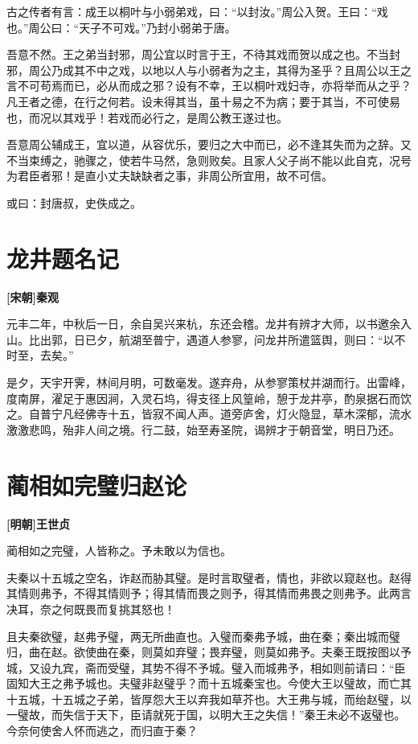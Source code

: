 \documentclass[UTF8,titlepage,oneside]{ctexbook}
\begin{document}
古之传者有言：成王以桐叶与小弱弟戏，曰：“以封汝。”周公入贺。王曰：“戏也。”周公曰：“天子不可戏。”乃封小弱弟于唐。


吾意不然。王之弟当封邪，周公宜以时言于王，不待其戏而贺以成之也。不当封邪，周公乃成其不中之戏，以地以人与小弱者为之主，其得为圣乎？且周公以王之言不可苟焉而已，必从而成之邪？设有不幸，王以桐叶戏妇寺，亦将举而从之乎？凡王者之德，在行之何若。设未得其当，虽十易之不为病；要于其当，不可使易也，而况以其戏乎！若戏而必行之，是周公教王遂过也。


吾意周公辅成王，宜以道，从容优乐，要归之大中而已，必不逢其失而为之辞。又不当束缚之，驰骤之，使若牛马然，急则败矣。且家人父子尚不能以此自克，况号为君臣者邪！是直小丈夫缺缺者之事，非周公所宜用，故不可信。


或曰：封唐叔，史佚成之。


\chapter*{龙井题名记}
\begin{center}
	\textbf{[宋朝]秦观}
\end{center}


元丰二年，中秋后一日，余自吴兴来杭，东还会稽。龙井有辨才大师，以书邀余入山。比出郭，日已夕，航湖至普宁，遇道人参寥，问龙井所遣篮舆，则曰：“以不时至，去矣。”


是夕，天宇开霁，林间月明，可数毫发。遂弃舟，从参寥策杖并湖而行。出雷峰，度南屏，濯足于惠因涧，入灵石坞，得支径上风篁岭，憩于龙井亭，酌泉据石而饮之。自普宁凡经佛寺十五，皆寂不闻人声。道旁庐舍，灯火隐显，草木深郁，流水激激悲鸣，殆非人间之境。行二鼓，始至寿圣院，谒辨才于朝音堂，明日乃还。



\chapter*{蔺相如完璧归赵论}
\begin{center}
	\textbf{[明朝]王世贞}
\end{center}

蔺相如之完璧，人皆称之。予未敢以为信也。

夫秦以十五城之空名，诈赵而胁其璧。是时言取璧者，情也，非欲以窥赵也。赵得其情则弗予，不得其情则予；得其情而畏之则予，得其情而弗畏之则弗予。此两言决耳，奈之何既畏而复挑其怒也！

且夫秦欲璧，赵弗予璧，两无所曲直也。入璧而秦弗予城，曲在秦；秦出城而璧归，曲在赵。欲使曲在秦，则莫如弃璧；畏弃璧，则莫如弗予。夫秦王既按图以予城，又设九宾，斋而受璧，其势不得不予城。璧入而城弗予，相如则前请曰：“臣固知大王之弗予城也。夫璧非赵璧乎？而十五城秦宝也。今使大王以璧故，而亡其十五城，十五城之子弟，皆厚怨大王以弃我如草芥也。大王弗与城，而绐赵璧，以一璧故，而失信于天下，臣请就死于国，以明大王之失信！”秦王未必不返璧也。今奈何使舍人怀而逃之，而归直于秦？
\end{document}
